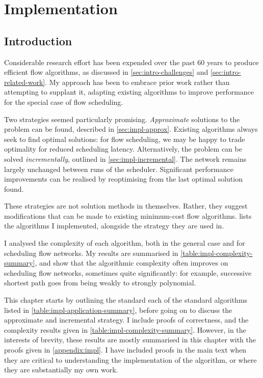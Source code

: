 \chapter{Implementation} \label{chap:impl}

\section{Introduction}


Considerable research effort has been expended over the past 60 years to produce efficient flow algorithms, as discussed in \cref{sec:intro-challenges} and \cref{sec:intro-related-work}. My approach has been to embrace prior work rather than attempting to supplant it, adapting existing algorithms to improve performance for the special case of flow scheduling.

Two strategies seemed particularly promising. \emph{Approximate} solutions to the problem can be found, described in \cref{sec:impl-approx}. Existing algorithms always seek to find optimal solutions: for flow scheduling, we may be happy to trade optimality for reduced scheduling latency. Alternatively, the problem can be solved \emph{incrementally}, outlined in \cref{sec:impl-incremental}. The network remains largely unchanged between runs of the scheduler. Significant performance improvements can be realised by reoptimising from the last optimal solution found. 

These strategies are not solution methods in themselves. Rather, they suggest modifications that can be made to existing minimum-cost flow algorithms.  lists the algorithms I implemented, alongside the strategy they are used in.

I analysed the complexity of each algorithm, both in the general case and for scheduling flow networks. My results are summarised in \cref{table:impl-complexity-summary}, and show that the algorithmic complexity often improves on scheduling flow networks, sometimes quite significantly: for example, successive shortest path goes from being weakly to strongly polynomial.

This chapter starts by outlining the standard each of the standard algorithms listed in \cref{table:impl-application-summary}, before going on to discuss the approximate and incremental strategy. I include proofs of correctness, and the complexity results given in \cref{table:impl-complexity-summary}. However, in the interests of brevity, these results are mostly summarised in this chapter with the proofs given in \cref{appendix:impl}. I have included proofs in the main text when they are critical to understanding the implementation of the algorithm, or where they are substantially my own work.


